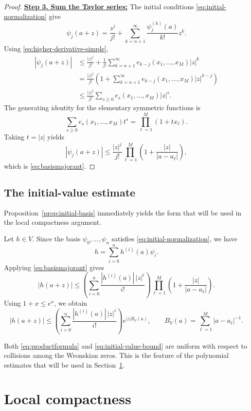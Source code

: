 \documentclass[12pt,letterpaper,reqno]{amsart}
\theoremstyle{definition}
\numberwithin{equation}{section}
\begin{document}
\begin{proof}
\medskip\noindent
\textbf{\underline{Step 3. Sum the Taylor series:}}
The initial conditions \eqref{eq:initial-normalization} give
\[
\psi_j(a+z)
=
\frac{z^j}{j!}
+
\sum_{k={n+1}}^{\infty}
\frac{\psi_j^{(k)}(a)}{k!}z^k.
\]
Using \eqref{eq:higher-derivative-simple},
\[
\begin{aligned}
|\psi_j(a+z)|
&\leq
\frac{|z|^j}{j!}
+
\frac1{j!}
\sum_{k={n+1}}^{\infty}
e_{k-j}(x_1,\ldots,x_M)|z|^k\\
&=
\frac{|z|^j}{j!}
\left(
1+
\sum_{k={n+1}}^{\infty}
e_{k-j}(x_1,\ldots,x_M)|z|^{k-j}
\right)\\
&\leq
\frac{|z|^j}{j!}
\sum_{s\geq0}
e_s(x_1,\ldots,x_M)|z|^s.
\end{aligned}
\]
The generating identity for the elementary symmetric functions is
\[
\sum_{s\geq0}
e_s(x_1,\ldots,x_M)t^s
=
\prod_{\ell=1}^M(1+t x_\ell).
\]
Taking \(t=|z|\) yields
\[
|\psi_j(a+z)|
\leq
\frac{|z|^j}{j!}
\prod_{\ell=1}^M
\left(
1+\frac{|z|}{|a-a_\ell|}
\right),
\]
which is \eqref{eq:basismajorant}.
\end{proof}


\subsection{The initial-value estimate}
\label{sec:initial-value-bound}

Proposition~\ref{prop:initial-basis} immediately yields the form that
will be used in the local compactness argument.

Let \(h\in V\). Since the basis
\(\psi_0,\ldots,\psi_{n}\) satisfies
\eqref{eq:initial-normalization}, we have
\[
h
=
\sum_{i=0}^{n}
h^{(i)}(a)\psi_i.
\]
Applying \eqref{eq:basismajorant} gives
\[
|h(a+z)|
\leq
\left(
\sum_{i=0}^{n}
\frac{|h^{(i)}(a)|\,|z|^i}{i!}
\right)
\prod_{\ell=1}^M
\left(
1+\frac{|z|}{|a-a_\ell|}
\right).
\]
Using \(1+x\leq e^x\), we obtain
\begin{equation}\label{eq:initial-value-bound}
 |h(a+z)|
 \leq
 \left(
 \sum_{i=0}^{n}
 \frac{|h^{(i)}(a)|\,|z|^i}{i!}
 \right)
 e^{|z|B_V(a)},
 \qquad
 B_V(a)
 =
 \sum_{\ell=1}^M|a-a_\ell|^{-1}.
\end{equation}

Both \eqref{eq:productformula} and
\eqref{eq:initial-value-bound} are uniform with respect to collisions
among the Wronskian zeros. This is the feature of the polynomial
estimates that will be used in Section~\ref{sec:compactness}.

\section{Local compactness}\label{sec:compactness}
\end{document}

